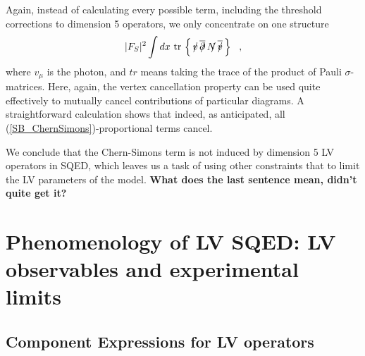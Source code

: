 \documentclass[12pt]{revtex4}
\newcommand{\slashed}[1]{\hbox{{$#1$}\llap{$/$}}}
\begin{document}
Again, instead of calculating every possible term, including the threshold corrections 
to dimension 5 operators, we only concentrate on one structure 
\begin{equation}
\label{SB_ChernSimons}
|F_S|^2 \int dx ~ \mathrm{tr} \,\left\{\, 
      \slashed{v} \, \overline{\slashed{\partial}} \,
      \slashed{N} \, \overline{\slashed{v}} \,
                              \right\}
~~,
\end{equation}
where $ v_\mu $ is the photon, and $ tr $ means
taking the trace of the product of Pauli 
$ \sigma $-matrices.
Here, again, the vertex cancellation property
can be used quite effectively to mutually cancel 
contributions of particular diagrams.
A straightforward calculation shows that indeed,
as anticipated, all (\ref{SB_ChernSimons})-proportional terms cancel.



We conclude that  the Chern-Simons term is not induced
by dimension 5 LV operators in SQED, which leaves us a task of 
    using other constraints that \cite{CFJ} to limit the LV parameters of the model.
{\bf What does the last sentence mean, didn't quite get it?}

\section{Phenomenology of LV SQED: LV observables and experimental limits}
\label{Phenomenology}
\subsection{Component Expressions for LV operators}
\end{document}

